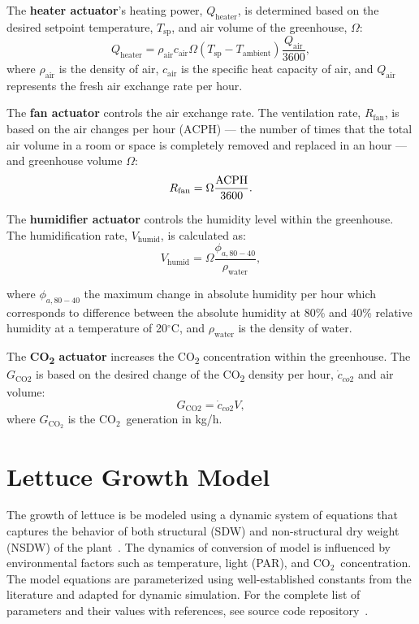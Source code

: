 \documentclass[conference]{IEEEtran}
\newcommand{\coo}{\ensuremath{\mathrm{CO_2}}}
\begin{document}
The \textbf{heater actuator}'s heating power, \( Q_{\text{heater}} \), is determined based on the desired setpoint temperature, \( T_{\text{sp}} \), and air volume of the greenhouse, \( \Omega \):
\begin{equation}
    Q_{\text{heater}} = \rho_{\text{air}}  c_{\text{air}}  \Omega  (T_{\text{sp}} - T_{\text{ambient}})  \frac{Q_{\text{air}}}{3600},
\end{equation}
where \( \rho_{\text{air}} \) is the density of air, \( c_{\text{air}} \) is the specific heat capacity of air, and \( Q_{\text{air}} \) represents the fresh air exchange rate per hour.

The \textbf{fan actuator} controls the air exchange rate. The ventilation rate, \( R_{\text{fan}} \), is based on the air changes per hour (\( \text{ACPH} \)) --- the number of times that the total air volume in a room or space is completely removed and replaced in an hour --- and greenhouse volume \(\Omega\):
\begin{equation}
    R_{\text{fan}} = \Omega \frac{\text{\( \text{ACPH} \)}}{3600}.
\end{equation}

The \textbf{humidifier actuator} controls the humidity level within the greenhouse. The humidification rate, \( V_{\text{humid}} \), is calculated as:
\begin{equation}
    V_{\text{humid}} = \Omega \frac{\phi_{a, 80 - 40}}{\rho_{\text{water}}},
\end{equation}

where \( \phi_{a, 80 - 40} \) the maximum change in absolute humidity per hour which corresponds to difference between the absolute humidity at 80\% and 40\% relative humidity at a temperature of 20\( ^\circ \)C, and \( \rho_{\text{water}} \) is the density of water.

The \textbf{CO\textsubscript{2} actuator} increases the CO\textsubscript{2} concentration within the greenhouse. The \( G_{\text{CO2}} \) is based on the desired change of the CO\textsubscript{2} density per hour, \( \dot{c}_{co2} \) and air volume:
\begin{equation}
    G_{\text{CO2}} = \dot{c}_{co2}  V,
\end{equation}
where \( G_{\coo} \) is the \coo\ generation in kg/h.


\section{Lettuce Growth Model}\label{sec:lettuce_growth}
The growth of lettuce is be modeled using a dynamic system of equations that captures the behavior of both structural (SDW) and non-structural dry weight (NSDW) of the plant~\cite{VANHENTEN199455}. The dynamics of conversion of  model is influenced by environmental factors such as temperature, light (PAR), and \coo\ concentration. The model equations are parameterized using well-established constants from the literature and adapted for dynamic simulation. For the complete list of parameters and their values with references, see source code repository~\cite{Wadinger2024}.
\end{document}
